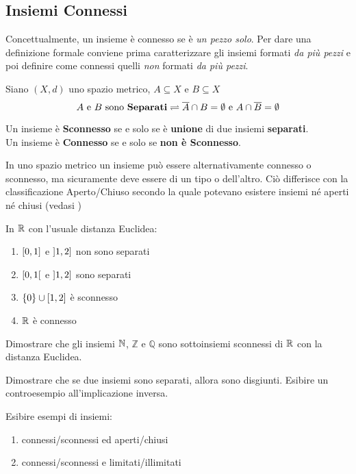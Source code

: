 \subsection{Insiemi Connessi}
Concettualmente, un insieme è connesso se è \textit{un pezzo solo}. Per dare una definizione formale conviene prima caratterizzare gli insiemi formati \textit{da più pezzi} e poi definire come connessi quelli \textit{non} formati \textit{da più pezzi}.
\begin{definition}
	Siano $(X,d)$ uno spazio metrico, $A \subseteq X$ e $B \subseteq X$
	$$A \text{ e } B \text{ sono \textbf{Separati}} \rightleftharpoons \overline{A} \cap B = \emptyset \text{ e } A \cap \overline{B} = \emptyset$$
\end{definition}
\begin{definition}
	Un insieme è \textbf{Sconnesso} se e solo se è \textbf{unione} di due insiemi \textbf{separati}.\\
	Un insieme è \textbf{Connesso} se e solo se \textbf{non è Sconnesso}.
	\begin{note}
		In uno spazio metrico un insieme può essere alternativamente connesso o sconnesso, ma sicuramente deve essere di un tipo o dell'altro. Ciò differisce con la classificazione Aperto/Chiuso secondo la quale potevano esistere insiemi né aperti né chiusi (vedasi )
	\end{note}
\end{definition}
\begin{example}
	In $\mathbb{R}$ con l'usuale distanza Euclidea:
	\begin{enumerate}
		\item $\left[0,1\right]$ e $\left]1,2\right]$ non sono separati
		\item $\left[0,1\right[$ e $\left]1,2\right]$ sono separati
		\item $\left\{0\right\} \cup \left[1,2\right]$ è sconnesso
		\item $\mathbb{R}$ è connesso
	\end{enumerate}
\end{example}
\begin{exercise}
	Dimostrare che gli insiemi $\mathbb{N}$, $\mathbb{Z}$ e $\mathbb{Q}$ sono sottoinsiemi sconnessi di $\mathbb{R}$ con la distanza Euclidea.
\end{exercise}
\begin{exercise}
	Dimostrare che se due insiemi sono separati, allora sono disgiunti. Esibire un controesempio all'implicazione inversa.
\end{exercise}
\begin{exercise}
	Esibire esempi di insiemi:
	\begin{enumerate}
		\item connessi/sconnessi ed aperti/chiusi
		\item connessi/sconnessi e limitati/illimitati
	\end{enumerate}
\end{exercise}

